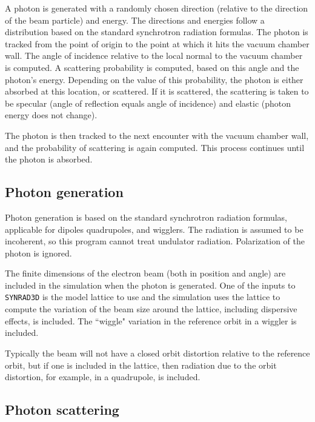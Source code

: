 \documentclass[11pt]{article}
\newcommand{\srthree}{\texttt{SYNRAD3D}\xspace}
\begin{document}
A photon is generated with a randomly chosen direction (relative to
the direction of the beam particle) and energy. The directions and
energies follow a distribution based on the standard synchrotron
radiation formulas. The photon is tracked from the point of origin to
the point at which it hits the vacuum chamber wall. The angle of
incidence relative to the local normal to the vacuum chamber is
computed. A scattering probability is computed, based on this angle
and the photon's energy. Depending on the value of this probability,
the photon is either absorbed at this location, or scattered. If it is
scattered, the scattering is taken to be specular (angle of reflection
equals angle of incidence) and elastic (photon energy does not
change).

The photon is then tracked to the next encounter with the vacuum
chamber wall, and the probability of scattering is again
computed. This process continues until the photon is absorbed.

\subsection{Photon generation}

Photon generation is based on the standard synchrotron radiation
formulas, applicable for dipoles quadrupoles, and wigglers. The
radiation is assumed to be incoherent, so this program cannot treat
undulator radiation. Polarization of the photon is ignored.

The finite dimensions of the electron beam (both in position and
angle) are included in the simulation when the photon is
generated. One of the inputs to \srthree is the model lattice
to use and the simulation uses the lattice to compute the
variation of the beam size around the lattice, including dispersive
effects, is included. The ``wiggle" variation in the reference orbit
in a wiggler is included.

Typically the beam will not have a closed orbit distortion relative to
the reference orbit, but if one is included in the lattice, then
radiation due to the orbit distortion, for example, in a quadrupole,
is included.  

\subsection{Photon scattering} 
\end{document}
